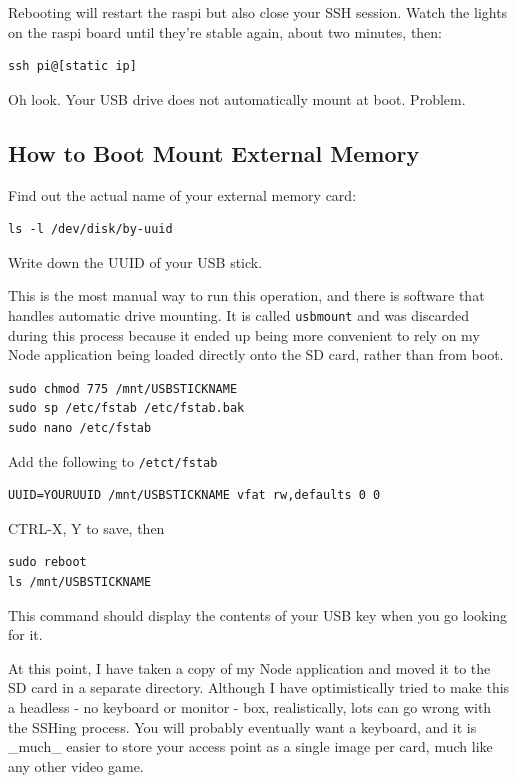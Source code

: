 Rebooting will restart the raspi but also close your SSH session. Watch the lights on the raspi board until they're stable again, about two minutes, then:
\begin{lstlisting}
ssh pi@[static ip]
\end{lstlisting}

Oh look. Your USB drive does not automatically mount at boot. Problem.

\subsection{How to Boot Mount External Memory}

Find out the actual name of your external memory card:
\begin{lstlisting}
ls -l /dev/disk/by-uuid
\end{lstlisting}

Write down the UUID of your USB stick.

This is the most manual way to run this operation, and there is software that handles automatic drive mounting. It is called \texttt{usbmount} and was discarded during this process because it ended up being more convenient to rely on my Node application being loaded directly onto the SD card, rather than from boot.

\begin{lstlisting}
sudo chmod 775 /mnt/USBSTICKNAME
sudo sp /etc/fstab /etc/fstab.bak
sudo nano /etc/fstab
\end{lstlisting}

Add the following to \texttt{/etct/fstab}
\begin{lstlisting}
UUID=YOURUUID /mnt/USBSTICKNAME vfat rw,defaults 0 0
\end{lstlisting}

CTRL-X, Y to save, then
\begin{lstlisting}
sudo reboot
ls /mnt/USBSTICKNAME
\end{lstlisting}

This command should display the contents of your USB key when you go looking for it.

At this point, I have taken a copy of my Node application and moved it to the SD card in a separate directory. Although I have optimistically tried to make this a headless - no keyboard or monitor - box, realistically, lots can go wrong with the SSHing process. You will probably eventually want a keyboard, and it is _much_ easier to store your access point as a single image per card, much like any other video game.

